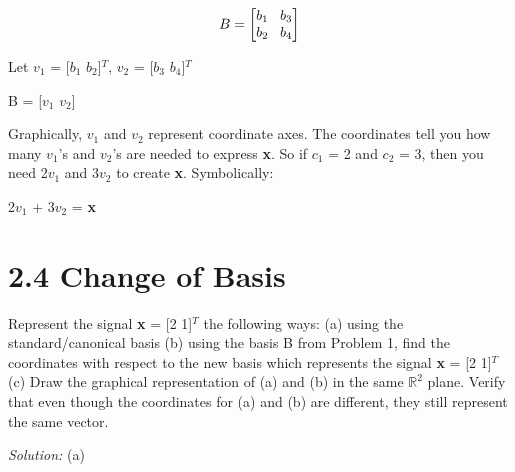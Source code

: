 \documentclass[11pt]{article}
\begin{document}
\begin{center}
\[
B = 
\begin{bmatrix}
   b_1  \hspace{3mm}   b_3 \\
   b_2 \hspace{3mm}   b_4            
\end{bmatrix}
\]
\end{center}

Let $v_1$ = [$b_1$ $b_2$]$^T$, $v_2$ = [$b_3$ $b_4$]$^T$

\vspace{4mm}
\begin{center}
B =  [\textbf{$v_1$} \textbf{$v_2$}] 

\end{center}

\hspace{3mm}

Graphically, $v_1$ and $v_2$ represent coordinate axes.  The coordinates tell you how many $v_1$'s and $v_2$'s are needed to express \textbf{x}. So if $c_1$ = 2 and $c_2$ = 3, then you need 2$v_1$ and 3$v_2$ to create \textbf{x}. Symbolically:
\begin{center}

2$v_1$ + 3$v_2$ = \textbf{x}

\end{center}

\newpage

\section*{2.4 \hspace{3mm} Change of Basis}

Represent the signal \textbf{x} = [2 1]$^{T}$ the following ways: \newline
(a) using the standard/canonical basis\newline
(b) using the basis B from Problem 1, find the coordinates with respect to the new basis which represents the signal \textbf{x} = [2 1]$^{T}$\newline
(c) Draw the graphical representation of (a) and (b) in the same $\mathbb{R}^2$ plane. Verify that even though the coordinates for (a) and (b) are different, they still represent the same vector.

\vspace{5mm}
\emph{Solution:}\newline
(a)
\end{document}
